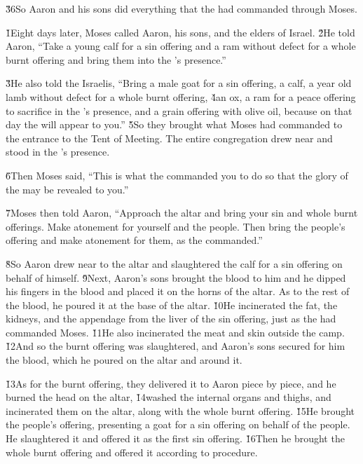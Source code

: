 \v{36}So Aaron and his sons did everything that the  had commanded through Moses.

\v{1}Eight days later, Moses called Aaron, his sons, and the elders of Israel. \v{2}He told Aaron, ``Take a young calf for a sin offering and a ram without defect for a whole burnt offering and bring them into the 's presence.''

\v{3}He also told the Israelis, ``Bring a male goat for a sin offering, a calf, a year old lamb without defect for a whole burnt offering, \v{4}an ox, a ram for a peace offering to sacrifice in the 's presence, and a grain offering with olive oil, because on that day the  will appear to you.'' \v{5}So they brought what Moses had commanded to the entrance to the Tent of Meeting. The entire congregation drew near and stood in the 's presence.

\v{6}Then Moses said, ``This is what the  commanded you to do so that the glory of the  may be revealed to you.''

\v{7}Moses then told Aaron, ``Approach the altar and bring your sin and whole burnt offerings. Make atonement for yourself and the people. Then bring the people's offering and make atonement for them, as the  commanded.''

\v{8}So Aaron drew near to the altar and slaughtered the calf for a sin offering on behalf of himself. \v{9}Next, Aaron's sons brought the blood to him and he dipped his fingers in the blood and placed it on the horns of the altar. As to the rest of the blood, he poured it at the base of the altar. \v{10}He incinerated the fat, the kidneys, and the appendage from the liver of the sin offering, just as the  had commanded Moses. \v{11}He also incinerated the meat and skin outside the camp. \v{12}And so the burnt offering was slaughtered, and Aaron's sons secured for him the blood, which he poured on the altar and around it.

\v{13}As for the burnt offering, they delivered it to Aaron piece by piece, and he burned the head on the altar, \v{14}washed the internal organs and thighs, and incinerated them on the altar, along with the whole burnt offering. \v{15}He brought the people's offering, presenting a goat for a sin offering on behalf of the people. He slaughtered it and offered it as the first sin offering. \v{16}Then he brought the whole burnt offering and offered it according to procedure.

